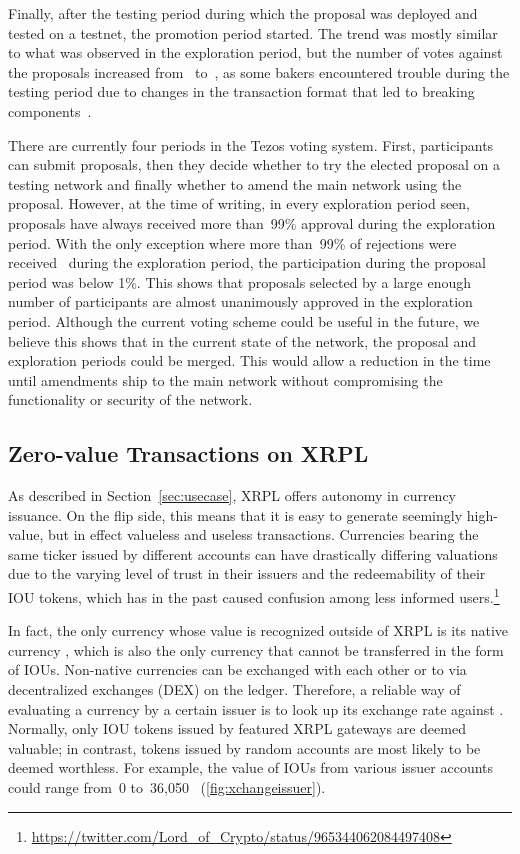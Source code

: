 Finally, after the testing period during which the proposal was deployed and tested on a testnet, the promotion period started.
The trend was mostly similar to what was observed in the exploration period, but the number of votes against the proposals increased from~ to~, as some bakers encountered trouble during the testing period due to changes in the transaction format that led to breaking components~\cite{ObsidianSys}.

There are currently four periods in the Tezos voting system. 
First, participants can submit proposals, then they decide whether to try the elected proposal on a testing network and finally whether to amend the main network using the proposal. 
However, at the time of writing, in every exploration period seen, proposals have always received more than~99\% approval during the exploration period.
With the only exception where more than~99\% of rejections were received~\cite{tezos-vote-reject} during the exploration period, the participation during the proposal period was below 1\%.
This shows that proposals selected by a large enough number of participants are almost unanimously approved in the exploration period.
Although the current voting scheme could be useful in the future, we believe this shows that in the current state of the network, the proposal and exploration periods could be merged.
This would allow a reduction in the time until amendments ship to the main network without compromising the functionality or security of the network.

\subsection{Zero-value Transactions on XRPL}
\label{sec:xrpcase}

As described in Section~\ref{sec:usecase}, XRPL offers autonomy in currency issuance. On the flip side, this means that it is easy to generate seemingly high-value, but in effect valueless and useless transactions. 
Currencies bearing the same ticker issued by different accounts can have drastically differing valuations due to the varying level of trust in their issuers and the redeemability of their IOU tokens, which has in the past caused confusion among less informed users.\footnote{\url{https://twitter.com/Lord_of_Crypto/status/965344062084497408}}

In fact, the only currency whose value is recognized outside of XRPL is its native currency , which is also the only currency that cannot be transferred in the form of IOUs. 
Non-native currencies can be exchanged with each other or to  via decentralized exchanges (DEX) on the ledger. 
Therefore, a reliable way of evaluating a currency by a certain issuer is to look up its exchange rate against . 
Normally, only IOU tokens issued by featured XRPL gateways are deemed valuable; in contrast, tokens issued by random accounts are most likely to be deemed worthless. 
For example, the value of  IOUs from various issuer accounts could range from~0 to~36,050~ (\autoref{fig:xchangeissuer}).

